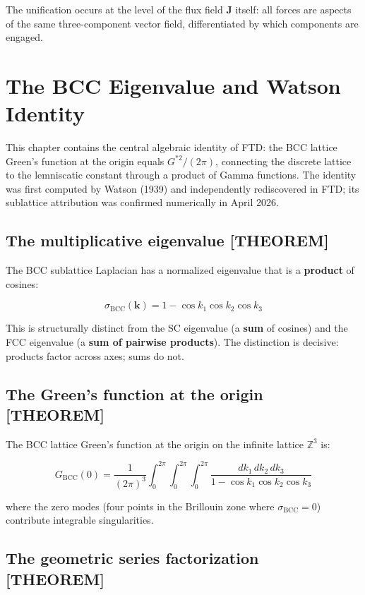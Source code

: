 \documentclass[
  11pt,
  letterpaper,
  twoside,
  openany]{book}
\makeatletter
\let\orig@section\section
\renewcommand{\section}{\needspace{8\baselineskip}\orig@section}
\newcommand{\Gssq}{G^{*2}{}}      %
\makeatother
\begin{document}
The unification occurs at the level of the flux field \(\mathbf{J}\)
itself: all forces are aspects of the same three-component vector field,
differentiated by which components are engaged.

\chapter{The BCC Eigenvalue and Watson Identity}\label{sec-bcc}

This chapter contains the central algebraic identity of FTD: the BCC
lattice Green's function at the origin equals \(\Gssq/(2\pi)\),
connecting the discrete lattice to the lemniscatic constant through a
product of Gamma functions. The identity was first computed by Watson
(1939) and independently rediscovered in FTD; its sublattice attribution
was confirmed numerically in April 2026.

\section{The multiplicative eigenvalue
{[}THEOREM{]}}\label{the-multiplicative-eigenvalue-theorem}

The BCC sublattice Laplacian has a normalized eigenvalue that is a
\textbf{product} of cosines:

\[
\sigma_{\text{BCC}}(\mathbf{k}) = 1 - \cos k_1 \cos k_2 \cos k_3
\tag{6.1}
\]

This is structurally distinct from the SC eigenvalue (a \textbf{sum} of
cosines) and the FCC eigenvalue (a \textbf{sum of pairwise products}).
The distinction is decisive: products factor across axes; sums do not.

\section{The Green's function at the origin
{[}THEOREM{]}}\label{the-greens-function-at-the-origin-theorem}

The BCC lattice Green's function at the origin on the infinite lattice
\(\mathbb{Z}^3\) is:

\[
G_{\text{BCC}}(0) = \frac{1}{(2\pi)^3} \int_0^{2\pi} \!\! \int_0^{2\pi} \!\! \int_0^{2\pi} \frac{dk_1 \, dk_2 \, dk_3}{1 - \cos k_1 \cos k_2 \cos k_3}
\tag{6.2}
\]

where the zero modes (four points in the Brillouin zone where
\(\sigma_{\text{BCC}} = 0\)) contribute integrable singularities.

\section{The geometric series factorization
{[}THEOREM{]}}\label{the-geometric-series-factorization-theorem}
\end{document}
